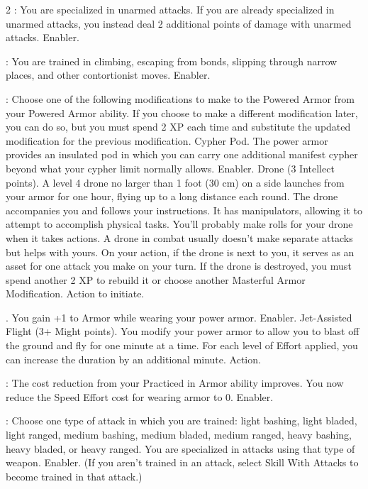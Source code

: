 \begin{multicols}{2}
: You are specialized in unarmed attacks. If you are already specialized in unarmed attacks, you instead deal 2 additional points of damage with unarmed attacks. Enabler.
 
: You are trained in climbing, escaping from bonds, slipping through narrow places, and other contortionist moves. Enabler. 
 
: Choose one of the following modifications to make to the Powered Armor from your Powered Armor ability. If you choose to make a different modification later, you can do so, but you must spend 2 XP each time and substitute the updated modification for the previous modification. 
Cypher Pod. The power armor provides an insulated pod in which you can carry one additional manifest cypher beyond what your cypher limit normally allows. Enabler. 
Drone (3 Intellect points). A level 4 drone no larger than 1 foot (30 cm) on a side launches from your armor for one hour, flying up to a long distance each round. The drone accompanies you and follows your instructions. It has manipulators, allowing it to attempt to accomplish physical tasks. You’ll probably make rolls for your drone when it takes actions. A drone in combat usually doesn’t make separate attacks but helps with yours. On your action, if the drone is next to you, it serves as an asset for one attack you make on your turn. If the drone is destroyed, you must spend another 2 XP to rebuild it or choose another Masterful Armor Modification. Action to initiate.

. You gain +1 to Armor while wearing your power armor. Enabler. 
Jet-Assisted Flight (3+ Might points). You modify your power armor to allow you to blast off the ground and fly for one minute at a time. For each level of Effort applied, you can increase the duration by an additional minute. Action. 
 
: The cost reduction from your Practiced in Armor ability improves. You now reduce the Speed Effort cost for wearing armor to 0. Enabler. 
 
: Choose one type of attack in which you are trained: light bashing, light bladed, light ranged, medium bashing, medium bladed, medium ranged, heavy bashing, heavy bladed, or heavy ranged. You are specialized in attacks using that type of weapon. Enabler. (If you aren’t trained in an attack, select Skill With Attacks to become trained in that attack.)
 

\end{multicols}
